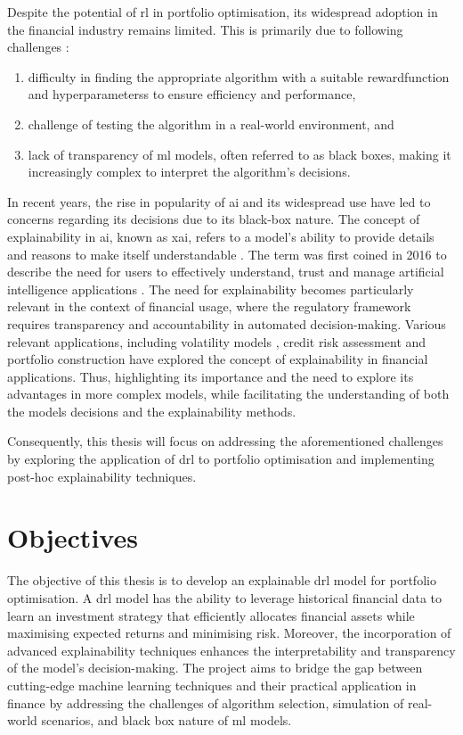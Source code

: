 Despite the potential of \acrshort{rl} in portfolio optimisation, its widespread adoption in the financial industry remains limited. This is primarily due to following challenges \cite{Cortes2024}:
\begin{enumerate}
    \item difficulty in finding the appropriate algorithm with a suitable \gls{rewardfunction} and \glspl{hyperparameters} to ensure efficiency and performance,
    \item challenge of testing the algorithm in a real-world environment, and
    \item lack of transparency of \acrshort{ml} models, often referred to as black boxes, making it increasingly complex to interpret the algorithm's decisions. 
\end{enumerate}

In recent years, the rise in popularity of \acrfull{ai} and its widespread use have led to concerns regarding its decisions due to its black-box nature. The concept of explainability in \acrshort{ai}, known as \acrfull{xai}, refers to a model's ability to provide details and reasons to make itself understandable \cite{BarredoArrieta2019}. The term was first coined in 2016 to describe the need for users to effectively understand, trust and manage artificial intelligence applications \cite{Gunning2019}. The need for explainability becomes particularly relevant in the context of financial usage, where the regulatory framework requires transparency and accountability in automated decision-making. Various relevant applications, including volatility models \cite{Brigo2021}, credit risk assessment \cite{GarciaCespedes2025} and portfolio construction \cite{Cortes2024} have explored the concept of explainability in financial applications. Thus, highlighting its importance and the need to explore its advantages in more complex models, while facilitating the understanding of both the models decisions and the explainability methods.

Consequently, this thesis will focus on addressing the aforementioned challenges by exploring the application of \acrfull{drl} to portfolio optimisation and implementing post-hoc explainability techniques. 

\section{Objectives} \label{sec:introduction-objectives}

The objective of this thesis is to develop an explainable \acrlong{drl} model for portfolio optimisation. A \acrshort{drl} model has the ability to leverage historical financial data to learn an investment strategy that efficiently allocates financial assets while maximising expected returns and minimising risk. Moreover, the incorporation of advanced explainability techniques enhances the interpretability and transparency of the model's decision-making. The project aims to bridge the gap between cutting-edge machine learning techniques and their practical application in finance by addressing the challenges of algorithm selection, simulation of real-world scenarios, and black box nature of \acrshort{ml} models.

